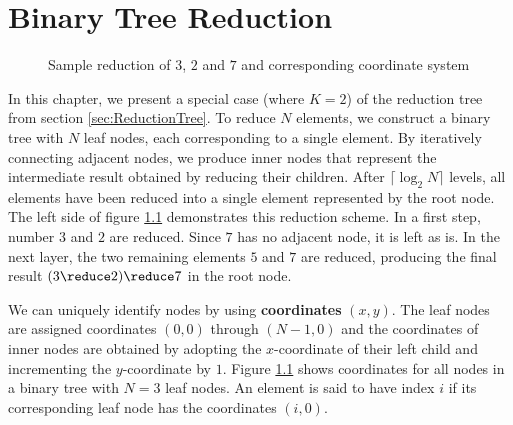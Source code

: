 \chapter{Binary Tree Reduction}
\label{ch:BinaryTreeSummation}

\newcommand{\numLevels}{\lceil \log_2 N \rceil}
\newcommand{\ffs}{\textrm{ffs}}
\newcommand{\nodesum}{\textrm{sum}\,}

\begin{figure}[H]
\centering
{}
\caption{Sample reduction of $3$, $2$ and $7$ and corresponding coordinate system}
\label{fig:coordinateExample}
\end{figure}

In this chapter, we present a special case (where $K = 2$) of the reduction tree from section \ref{sec:ReductionTree}.
To reduce $N$ elements, we construct a binary tree with $N$ leaf nodes,
each corresponding to a single element.
By iteratively connecting adjacent nodes, we produce inner nodes that represent the intermediate result obtained by reducing their children.
After $\numLevels$ levels, all elements have been reduced into a single element represented by the root node.
The left side of figure \ref{fig:coordinateExample} demonstrates this reduction scheme. In a first step, number $3$ and $2$ are reduced.
Since $7$ has no adjacent node, it is left as is. In the next layer, the two remaining elements $5$ and $7$ are reduced, producing the final
result $(3 \reduce 2) \reduce 7$ in the root node.

We can uniquely identify nodes by using \textbf{coordinates} $(x, y)$. The leaf nodes are assigned coordinates
$(0,0)$ through $(N-1,0)$ and the coordinates of inner nodes are obtained by adopting the $x$-coordinate of their left child and incrementing
the $y$-coordinate by $1$. Figure \ref{fig:coordinateExample} shows coordinates for all nodes in a binary tree with $N = 3$ leaf nodes.
An element is said to have index $i$ if its corresponding leaf node has the coordinates $(i,0)$.

